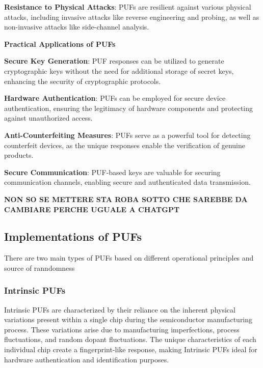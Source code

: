 \documentclass{article}
\begin{document}
\textbf{Resistance to Physical Attacks}: PUFs are resilient against various physical attacks, including invasive attacks like reverse engineering and probing, as well as non-invasive attacks like side-channel analysis.


\textbf{Practical Applications of PUFs}


\textbf{Secure Key Generation}: PUF responses can be utilized to generate cryptographic keys without the need for additional storage of secret keys, enhancing the security of cryptographic protocols.


\textbf{Hardware Authentication}: PUFs can be employed for secure device authentication, ensuring the legitimacy of hardware components and protecting against unauthorized access.


\textbf{Anti-Counterfeiting Measures}: PUFs serve as a powerful tool for detecting counterfeit devices, as the unique responses enable the verification of genuine products.


\textbf{Secure Communication}: PUF-based keys are valuable for securing communication channels, enabling secure and authenticated data transmission.



\textbf{NON SO SE METTERE STA ROBA SOTTO CHE SAREBBE DA CAMBIARE PERCHE UGUALE A CHATGPT}
\subsection{Implementations of PUFs}
There are two main types of PUFs based on different operational principles and source of ranndomness
\subsubsection{Intrinsic PUFs}

Intrinsic PUFs are characterized by their reliance on the inherent physical variations present within a single chip during the semiconductor manufacturing process. These variations arise due to manufacturing imperfections, process fluctuations, and random dopant fluctuations. The unique characteristics of each individual chip create a fingerprint-like response, making Intrinsic PUFs ideal for hardware authentication and identification purposes.
\end{document}
